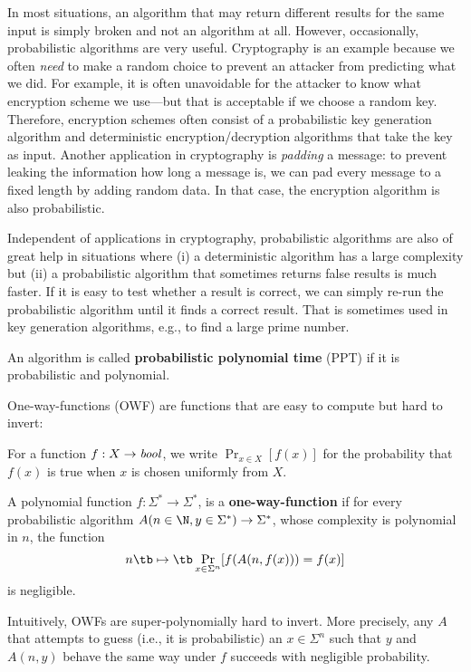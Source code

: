 In most situations, an algorithm that may return different results for the same input is simply broken and not an algorithm at all.
However, occasionally, probabilistic algorithms are very useful.
Cryptography is an example because we often \emph{need} to make a random choice to prevent an attacker from predicting what we did.
For example, it is often unavoidable for the attacker to know what encryption scheme we use---but that is acceptable if we choose a random key.
Therefore, encryption schemes often consist of a probabilistic key generation algorithm and deterministic encryption/decryption algorithms that take the key as input.
Another application in cryptography is \emph{padding} a message: to prevent leaking the information how long a message is, we can pad every message to a fixed length by adding random data.
In that case, the encryption algorithm is also probabilistic.

Independent of applications in cryptography, probabilistic algorithms are also of great help in situations where (i) a deterministic algorithm has a large complexity but (ii) a probabilistic algorithm that sometimes returns false results is much faster.
If it is easy to test whether a result is correct, we can simply re-run the probabilistic algorithm until it finds a correct result.
That is sometimes used in key generation algorithms, e.g., to find a large prime number.

\begin{definition}
 An algorithm is called \textbf{probabilistic polynomial time} (PPT) if it is probabilistic and polynomial.
\end{definition}

One-way-functions (OWF) are functions that are easy to compute but hard to invert:

\newcommand{\Prob}[2]{\mathop{\mathrm{Pr}}_{#1}[#2]}

\begin{notation}
For a function $f:X\to\mathit{bool}$, we write $\Prob{x\in X}{f(x)}$ for the probability that $f(x)$ is true when $x$ is chosen uniformly from $X$.
\end{notation}

\begin{definition}
 A polynomial function $f:\Sigma^*\to \Sigma^*$, is a \textbf{one-way-function} if for every probabilistic algorithm $A(n\in\N,y\in \Sigma^*)\to\Sigma^*$, whose complexity is polynomial in $n$, the function
 \[n\tb\mapsto\tb \Prob{x\in\Sigma^n}{f(A(n,f(x)))=f(x)}\]
 is negligible.
\end{definition}
Intuitively, OWFs are super-polynomially hard to invert.
More precisely, any $A$ that attempts to guess (i.e., it is probabilistic) an $x\in\Sigma^n$ such that $y$ and $A(n,y)$ behave the same way under $f$ succeeds with negligible probability.

